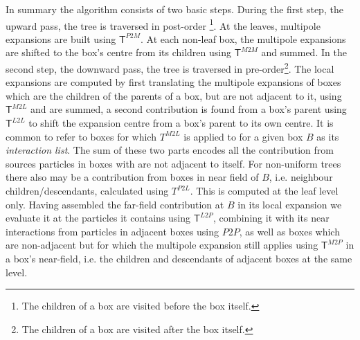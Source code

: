 In summary the algorithm consists of two basic steps. During the first step, the upward pass, the tree is traversed in post-order \footnote{The children of a box are visited before the box itself.}. At the leaves, multipole expansions are built using $\mathsf{T}^{P2M}$. At each non-leaf box, the multipole expansions are shifted to the box's centre from its children using $\mathsf{T}^{M2M}$ and summed. In the second step, the downward pass, the tree is traversed in pre-order\footnote{The children of a box are visited after the box itself.}. The local expansions are computed by first translating the multipole expansions of boxes which are the children of the parents of a box, but are not adjacent to it, using $\mathsf{T}^{M2L}$ and are summed, a second contribution is found from a box's parent using $\mathsf{T}^{L2L}$ to shift the expansion centre from a box's parent to its own centre. It is common to refer to boxes for which $T^{M2L}$ is applied to for a given box $B$ as its \textit{interaction list}. The sum of these two parts encodes all the contribution from sources particles in boxes with are not adjacent to itself. For non-uniform trees there also may be a contribution from boxes in near field of $B$, i.e. neighbour children/descendants, calculated using $T^{P2L}$. This is computed at the leaf level only. Having assembled the far-field contribution at $B$ in its local expansion we evaluate it at the particles it contains using $\mathsf{T}^{L2P}$, combining it with its near interactions from particles in adjacent boxes using $P2P$, as well as boxes which are non-adjacent but for which the multipole expansion still applies using $\mathsf{T}^{M2P}$ in a box's near-field, i.e. the children and descendants of adjacent boxes at the same level.

